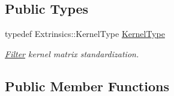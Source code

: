 \subsection*{Public Types}
\begin{DoxyCompactItemize}
\item 
typedef Extrinsics\-::\-Kernel\-Type \hyperlink{classffnn_1_1layer_1_1convolution_1_1_filter_ad5cce121107613f7bfd80ff7df649b96}{Kernel\-Type}
\begin{DoxyCompactList}\small\item\em \hyperlink{classffnn_1_1layer_1_1convolution_1_1_filter}{Filter} kernel matrix standardization. \end{DoxyCompactList}\end{DoxyCompactItemize}
\subsection*{Public Member Functions}
